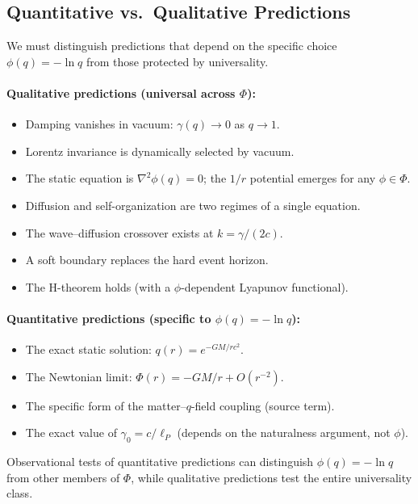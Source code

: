\documentclass[aps,prd,twocolumn,showpacs,superscriptaddress,preprintnumbers]{revtex4-2}
\begin{document}
\subsection{Quantitative vs.\ Qualitative Predictions}
\label{sec:qual_vs_quant}

We must distinguish predictions that depend on the specific choice $\phi(q)=-\ln q$ from those protected by universality.

\paragraph{Qualitative predictions (universal across $\Phi$):}
\begin{itemize}
    \item Damping vanishes in vacuum: $\gamma(q)\to0$ as $q\to1$.
    \item Lorentz invariance is dynamically selected by vacuum.
    \item The static equation is $\nabla^2\phi(q)=0$; the $1/r$ potential emerges for any $\phi\in\Phi$.
    \item Diffusion and self-organization are two regimes of a single equation.
    \item The wave--diffusion crossover exists at $k=\gamma/(2c)$.
    \item A soft boundary replaces the hard event horizon.
    \item The H-theorem holds (with a $\phi$-dependent Lyapunov functional).
\end{itemize}

\paragraph{Quantitative predictions (specific to $\phi(q)=-\ln q$):}
\begin{itemize}
    \item The exact static solution: $q(r)=e^{-GM/rc^2}$.
    \item The Newtonian limit: $\Phi(r)=-GM/r + O(r^{-2})$.
    \item The specific form of the matter--$q$-field coupling (source term).
    \item The exact value of $\gamma_0=c/\ell_P$ (depends on the naturalness argument, not $\phi$).
\end{itemize}

Observational tests of quantitative predictions can distinguish $\phi(q)=-\ln q$ from other members of $\Phi$, while qualitative predictions test the entire universality class.
\end{document}
